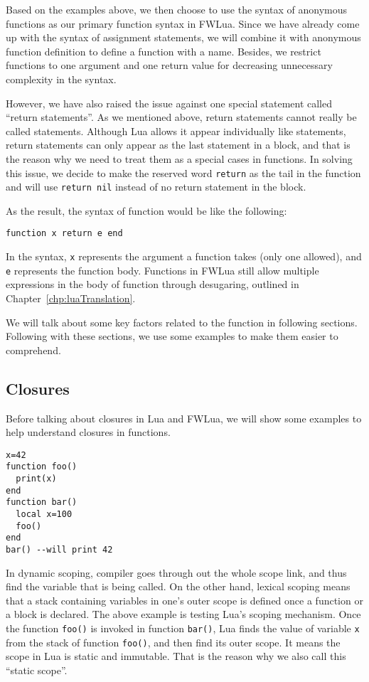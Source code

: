 Based on the examples above, we then choose to use the syntax of anonymous functions as our primary function syntax in FWLua. Since we have already come up with the syntax of assignment statements, we will combine it with anonymous function definition to define a function with a name. Besides, we restrict functions to one argument and one return value for decreasing unnecessary complexity in the syntax.

However, we have also raised the issue against one special statement called ``return statements''. As we mentioned above, return statements cannot really be called statements. Although Lua allows it appear individually like statements, return statements can only appear as the last statement in a block, and that is the reason why we need to treat them as a special cases in functions. In solving this issue, we decide to make the reserved word {\tt return} as the tail in the function and will use {\tt return nil} instead of no return statement in the block.

As the result, the syntax of function would be like the following:
\begin{verbatim}
function x return e end
\end{verbatim}
In the syntax, {\tt x} represents the argument a function takes (only one allowed), and {\tt e} represents the function body. Functions in FWLua still allow multiple expressions in the body of function through desugaring, outlined in Chapter~\ref{chp:luaTranslation}.

We will talk about some key factors related to the function in following sections. Following with these sections, we use some examples to make them easier to comprehend.

\subsection{Closures}
Before talking about closures in Lua and FWLua, we will show some examples to help understand closures in functions.
\begin{verbatim}
x=42
function foo()
  print(x)
end
function bar()
  local x=100
  foo()
end
bar() --will print 42
\end{verbatim}
In dynamic scoping, compiler goes through out the whole scope link, and thus find the variable that is being called.
On the other hand, lexical scoping means that a stack containing variables in one's outer scope is defined once a function or a block is declared.
The above example is testing Lua's scoping mechanism.
Once the function {\tt foo()} is invoked in function {\tt bar()}, Lua finds the value of variable {\tt x} from the stack of function {\tt foo()}, and then find its outer scope.
It means the scope in Lua is static and immutable. That is the reason why we also call this ``static scope''.


